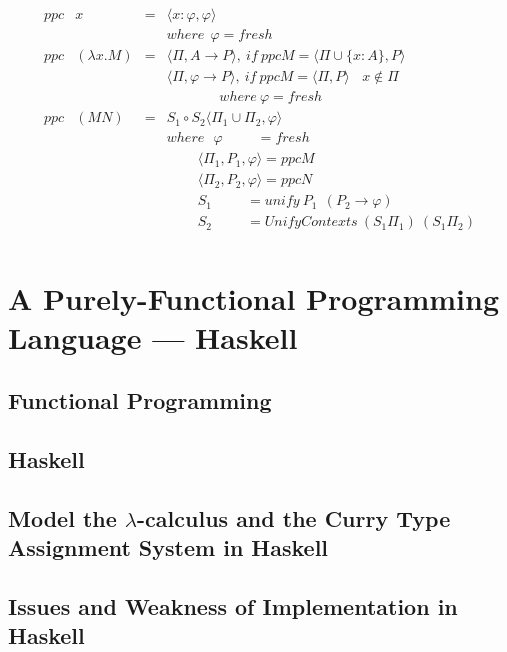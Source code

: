 \documentclass[a4paper,11pt,twoside]{report}
\begin{document}
\begin{equation*}
\begin{array}{llll}
ppc & x & = & \langle x:\varphi,\varphi \rangle\\
&&& where\ \ \varphi=fresh\\
ppc & (\lambda x.M) & = & \langle \Pi,A \rightarrow P \rangle,\ if\ ppcM=\langle \Pi \cup \{x:A\},P \rangle\\
&&& \langle \Pi,\varphi \rightarrow P \rangle,\ if\ ppcM=\langle \Pi ,P \rangle\ \ \ \ x\not\in \Pi\\
&&&\ \ \ \ \ \ \ \ \ \ \ \ \ \ \ \ \ where\ \varphi=fresh\\
ppc & (MN) & = & S_1\circ S_2\langle \Pi _1\cup \Pi _2,\varphi \rangle\\
&&& where\ \ \ \varphi \ \ \ \ \ \ \ \ \ \ \ = fresh\\
&&& \ \ \ \ \ \ \ \ \ \ \langle \Pi _1,P_1,\varphi \rangle = ppcM\\
&&& \ \ \ \ \ \ \ \ \ \ \langle \Pi _2,P_2,\varphi \rangle = ppcN\\
&&& \ \ \ \ \ \ \ \ \ \ S_1 \ \ \ \ \ \ \ \ \ \ \ = unify\ P_1\ \ (P_2 \rightarrow \varphi)\\
&&& \ \ \ \ \ \ \ \ \ \ S_2 \ \ \ \ \ \ \ \ \ \ \ = UnifyContexts\ (S_1\Pi _1)\ (S_1\Pi _2)\\
\end{array}
\end{equation*}


\chapter{A Purely-Functional Programming Language --- Haskell}

\section{Functional Programming}
\section{Haskell}
\section{Model the $\lambda$-calculus and the Curry Type Assignment System in Haskell}
\section{Issues and Weakness of Implementation in Haskell }
\end{document}
